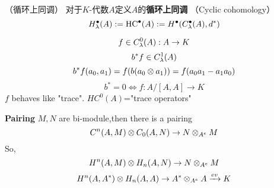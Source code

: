 
\begin{definition}（循环上同调）
对于$K$-代数$A$定义$A$的\textbf{循环上同调}
（Cyclic cohomology）
$$H^{\bullet}_{\lambda}(A):=\operatorname{HC}^{\bullet}(A)
:=H^{\bullet}(C_{\lambda}^{\bullet}(A),d^*)$$
\end{definition}

\begin{example}
$$f\in C_{\lambda}^0(A):A\to K$$
$$b^*f\in C^1_{\lambda}(A)$$
$$b^*f(a_0,a_1)=f(b(a_0\otimes a_1))=f(a_0a_1-a_1a_0)$$
$$b^*=0\iff f:A/[A,A]\to K$$
$f$ behaves like "trace".
$HC^0(A)$="trace operators"
\end{example}

\textbf{Pairing}
$M,N$ are bi-module,then there is a pairing
$$C^n(A,M)\otimes C_0(A,N)\to N\otimes_{A^e}M$$
So,
$$H^n(A,M)\otimes H_n(A,N)\to N\otimes_{A^e}M$$
$$H^n(A,A^*)\otimes H_n(A,A)\to A^*\otimes_{A^e}A\xrightarrow{ev}K$$ 